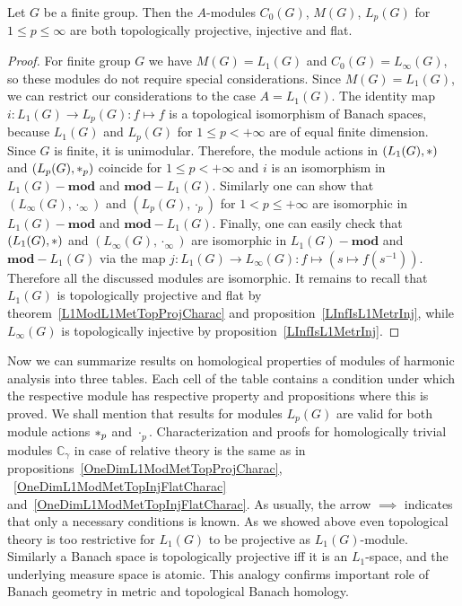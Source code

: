 \begin{proposition}\label{StdModFinGrL1MGTopInjProjFlatCharac} Let $G$ be a
finite group. Then the $A$-modules $C_0(G)$, $M(G)$, $L_p(G)$ 
for $1\leq p\leq \infty$ are both topologically projective, injective and flat.
\end{proposition} 
\begin{proof}
For finite group $G$ we have $M(G)=L_1(G)$ and $C_0(G)=L_\infty(G)$, so these
modules do not require special considerations. Since $M(G)=L_1(G)$, we can
restrict our considerations to the case $A=L_1(G)$. The identity map
$i:L_1(G)\to L_p(G):f\mapsto f$ is a topological isomorphism of Banach spaces,
because $L_1(G)$ and $L_p(G)$ for $1\leq p<+\infty$ are of equal finite
dimension. Since $G$ is finite, it is unimodular. Therefore, the module actions
in $(L_1(G),\ast)$ and $(L_p(G),\ast_p)$ coincide for $1\leq p<+\infty$
and $i$ is an isomorphism in $L_1(G)-\mathbf{mod}$ and $\mathbf{mod}-L_1(G)$.
Similarly one can show that $(L_\infty(G),\cdot_\infty)$ and $(L_p(G),\cdot_p)$
for $1<p\leq+\infty$ are isomorphic in $L_1(G)-\mathbf{mod}$ and
$\mathbf{mod}-L_1(G)$. Finally, one can easily check that $(L_1(G),\ast)$ and
$(L_\infty(G),\cdot_\infty)$ are isomorphic in $L_1(G)-\mathbf{mod}$ and
$\mathbf{mod}-L_1(G)$ via the 
map $j:L_1(G)\to L_\infty(G):f\mapsto(s\mapsto f(s^{-1}))$. Therefore all 
the discussed modules are isomorphic. It remains to
recall that $L_1(G)$ is topologically projective and flat by
theorem~\ref{L1ModL1MetTopProjCharac} and proposition~\ref{LInfIsL1MetrInj},
while $L_\infty(G)$ is topologically injective by
proposition~\ref{LInfIsL1MetrInj}.
\end{proof}

Now we can summarize results on homological properties of modules of harmonic
analysis into three tables. Each cell of the table contains a condition under
which the respective module has respective property and propositions where this
is proved. We shall mention that results for modules $L_p(G)$ are valid for both
module actions $\ast_p$ and $\cdot_p$. Characterization and proofs for
homologically trivial modules $\mathbb{C}_\gamma$ in case of relative theory is
the same as in
propositions~\ref{OneDimL1ModMetTopProjCharac},
~\ref{OneDimL1ModMetTopInjFlatCharac}
and~\ref{OneDimL1ModMetTopInjFlatCharac}. As usually, the arrow $\implies$
indicates that only a necessary conditions is known. As we showed above even
topological theory is too restrictive for $L_1(G)$ to be projective as
$L_1(G)$-module. Similarly a Banach space is topologically projective iff it is
an $L_1$-space, and the underlying measure space is atomic. This analogy
confirms important role of Banach geometry in metric and topological Banach
homology.

